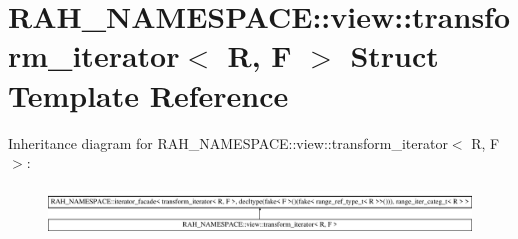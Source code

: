 \hypertarget{struct_r_a_h___n_a_m_e_s_p_a_c_e_1_1view_1_1transform__iterator}{}\section{R\+A\+H\+\_\+\+N\+A\+M\+E\+S\+P\+A\+CE\+::view\+::transform\+\_\+iterator$<$ R, F $>$ Struct Template Reference}
\label{struct_r_a_h___n_a_m_e_s_p_a_c_e_1_1view_1_1transform__iterator}
Inheritance diagram for R\+A\+H\+\_\+\+N\+A\+M\+E\+S\+P\+A\+CE\+::view\+::transform\+\_\+iterator$<$ R, F $>$\+:\begin{figure}[H]
\begin{center}
\leavevmode
\includegraphics[height=1.300813cm]{struct_r_a_h___n_a_m_e_s_p_a_c_e_1_1view_1_1transform__iterator}
\end{center}
\end{figure}
